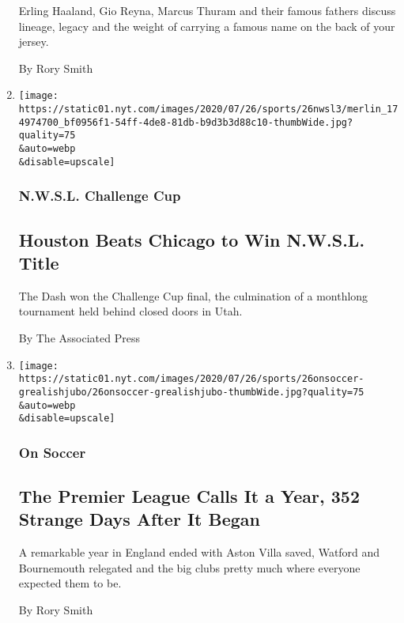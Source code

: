 \begin{enumerate}
  Erling Haaland, Gio Reyna, Marcus Thuram and their famous fathers
  discuss lineage, legacy and the weight of carrying a famous name on
  the back of your jersey.

  By Rory Smith
\item
  \href{/2020/07/26/sports/soccer/houston-dash-nwsl.html}{}

  \texttt{[image: https://static01.nyt.com/images/2020/07/26/sports/26nwsl3/merlin\_174974700\_bf0956f1-54ff-4de8-81db-b9d3b3d88c10-thumbWide.jpg?quality=75\\\&auto=webp\\\&disable=upscale]}

  \hypertarget{nwsl-challenge-cup}{%
  \subsubsection{N.W.S.L. Challenge Cup}\label{nwsl-challenge-cup}}

  \hypertarget{houston-beats-chicago-to-win-nwsl-title}{%
  \subsection{Houston Beats Chicago to Win N.W.S.L.
  Title}\label{houston-beats-chicago-to-win-nwsl-title}}

  The Dash won the Challenge Cup final, the culmination of a monthlong
  tournament held behind closed doors in Utah.

  By The Associated Press
\item
  \href{/2020/07/26/sports/soccer/premier-league-decision-day.html}{}

  \texttt{[image: https://static01.nyt.com/images/2020/07/26/sports/26onsoccer-grealishjubo/26onsoccer-grealishjubo-thumbWide.jpg?quality=75\\\&auto=webp\\\&disable=upscale]}

  \hypertarget{on-soccer}{%
  \subsubsection{On Soccer}\label{on-soccer}}

  \hypertarget{the-premier-league-calls-it-a-year-352-strange-days-after-it-began}{%
  \subsection{The Premier League Calls It a Year, 352 Strange Days After
  It
  Began}\label{the-premier-league-calls-it-a-year-352-strange-days-after-it-began}}

  A remarkable year in England ended with Aston Villa saved, Watford and
  Bournemouth relegated and the big clubs pretty much where everyone
  expected them to be.

  By Rory Smith
\end{enumerate}

